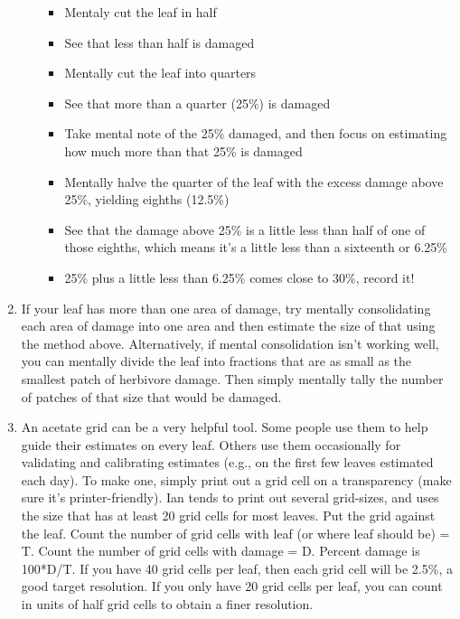 \documentclass[
  letterpaper,
  DIV=11,
  numbers=noendperiod]{scrreprt}
\providecommand{\tightlist}{%
  \setlength{\itemsep}{0pt}\setlength{\parskip}{0pt}}\usepackage{longtable,booktabs,array}
\begin{document}
\begin{enumerate}
\begin{itemize}
    \begin{itemize}
    \tightlist
    \item
      Mentaly cut the leaf in half
    \item
      See that less than half is damaged
    \item
      Mentally cut the leaf into quarters
    \item
      See that more than a quarter (25\%) is damaged
    \item
      Take mental note of the 25\% damaged, and then focus on estimating
      how much more than that 25\% is damaged
    \item
      Mentally halve the quarter of the leaf with the excess damage
      above 25\%, yielding eighths (12.5\%)
    \item
      See that the damage above 25\% is a little less than half of one
      of those eighths, which means it's a little less than a sixteenth
      or 6.25\%
    \item
      25\% plus a little less than 6.25\% comes close to 30\%, record
      it!
    \end{itemize}
  \end{itemize}
\item
  If your leaf has more than one area of damage, try mentally
  consolidating each area of damage into one area and then estimate the
  size of that using the method above. Alternatively, if mental
  consolidation isn't working well, you can mentally divide the leaf
  into fractions that are as small as the smallest patch of herbivore
  damage. Then simply mentally tally the number of patches of that size
  that would be damaged.
\item
  An acetate grid can be a very helpful tool. Some people use them to
  help guide their estimates on every leaf. Others use them occasionally
  for validating and calibrating estimates (e.g., on the first few
  leaves estimated each day). To make one, simply print out a grid cell
  on a transparency (make sure it's printer-friendly). Ian tends to
  print out several grid-sizes, and uses the size that has at least 20
  grid cells for most leaves. Put the grid against the leaf. Count the
  number of grid cells with leaf (or where leaf should be) = T. Count
  the number of grid cells with damage = D. Percent damage is 100*D/T.
  If you have 40 grid cells per leaf, then each grid cell will be 2.5\%,
  a good target resolution. If you only have 20 grid cells per leaf, you
  can count in units of half grid cells to obtain a finer resolution.

\end{enumerate}
\end{document}

